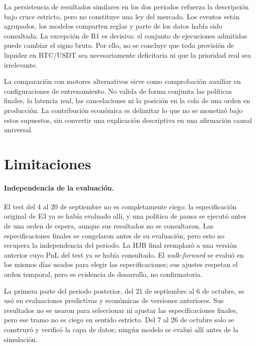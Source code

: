 La persistencia de resultados similares en los dos periodos refuerza la descripción bajo cruce estricto, pero no constituye una ley del mercado. Los eventos están agrupados, los modelos comparten reglas y parte de los datos había sido consultada. La excepción de R1 es decisiva: el conjunto de ejecuciones admitidas puede cambiar el signo bruto. Por ello, no se concluye que toda provisión de liquidez en BTC/USDT sea necesariamente deficitaria ni que la prioridad real sea irrelevante.

La comparación con motores alternativos sirve como comprobación auxiliar en configuraciones de entrenamiento. No valida de forma conjunta las políticas finales, la latencia real, las cancelaciones ni la posición en la cola de una orden en producción. La contribución económica es delimitar lo que no se monetizó bajo estos supuestos, sin convertir una explicación descriptiva en una afirmación causal universal.

\section{Limitaciones}
\label{sec:limitaciones}

\paragraph{Independencia de la evaluación.}
El test del 4 al 20 de septiembre no es completamente ciego: la especificación original de E3 ya se había evaluado allí, y una política de pausa se ejecutó antes de una orden de espera, aunque sus resultados no se consultaron. Las especificaciones finales se congelaron antes de su evaluación, pero esto no recupera la independencia del periodo. La HJB final reemplazó a una versión anterior cuyo PnL del test ya se había consultado. El \textit{walk-forward} se evaluó en los mismos días usados para elegir las especificaciones; sus ajustes respetan el orden temporal, pero es evidencia de desarrollo, no confirmatoria.

La primera parte del periodo posterior, del 21 de septiembre al 6 de octubre, se usó en evaluaciones predictivas y económicas de versiones anteriores. Sus resultados no se usaron para seleccionar ni ajustar las especificaciones finales, pero ese tramo no es ciego en sentido estricto. Del 7 al 26 de octubre solo se construyó y verificó la capa de datos; ningún modelo se evaluó allí antes de la simulación.

